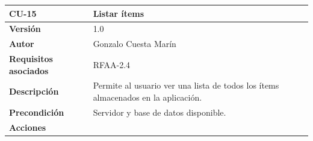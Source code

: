 \documentclass[
]{article}
\begin{document}
\begin{longtable}[]{@{}ll@{}}
\toprule
\begin{minipage}[b]{0.19\columnwidth}\raggedright
\textbf{CU-15}\strut
\end{minipage} & \begin{minipage}[b]{0.75\columnwidth}\raggedright
\textbf{Listar ítems}\strut
\end{minipage}\tabularnewline
\midrule
\endhead
\begin{minipage}[t]{0.19\columnwidth}\raggedright
\textbf{Versión}\strut
\end{minipage} & \begin{minipage}[t]{0.75\columnwidth}\raggedright
1.0\strut
\end{minipage}\tabularnewline
\begin{minipage}[t]{0.19\columnwidth}\raggedright
\textbf{Autor}\strut
\end{minipage} & \begin{minipage}[t]{0.75\columnwidth}\raggedright
Gonzalo Cuesta Marín\strut
\end{minipage}\tabularnewline
\begin{minipage}[t]{0.19\columnwidth}\raggedright
\textbf{Requisitos asociados}\strut
\end{minipage} & \begin{minipage}[t]{0.75\columnwidth}\raggedright
RFAA-2.4\strut
\end{minipage}\tabularnewline
\begin{minipage}[t]{0.19\columnwidth}\raggedright
\textbf{Descripción}\strut
\end{minipage} & \begin{minipage}[t]{0.75\columnwidth}\raggedright
Permite al usuario ver una lista de todos los ítems almacenados en la
aplicación.\strut
\end{minipage}\tabularnewline
\begin{minipage}[t]{0.19\columnwidth}\raggedright
\textbf{Precondición}\strut
\end{minipage} & \begin{minipage}[t]{0.75\columnwidth}\raggedright
Servidor y base de datos disponible.\strut
\end{minipage}\tabularnewline
\begin{minipage}[t]{0.19\columnwidth}\raggedright
\textbf{Acciones}\strut
\end{minipage} & \begin{minipage}[t]{0.75\columnwidth}\raggedright
\begin{enumerate}

\end{enumerate}
\end{minipage}
\end{longtable}
\end{document}
